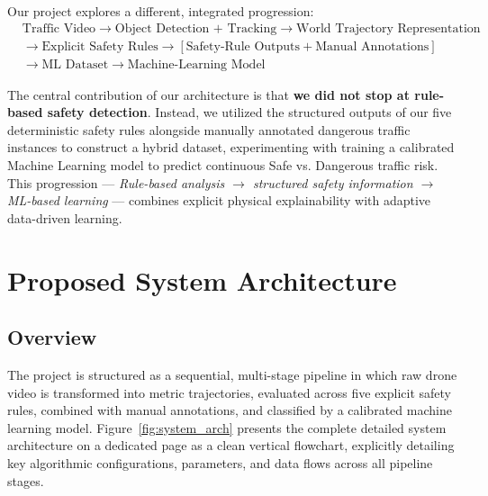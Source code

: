 \documentclass[12pt,a4paper]{report}
\begin{document}
Our project explores a different, integrated progression:
\begin{align*}
&\text{Traffic Video} \rightarrow \text{Object Detection + Tracking} \rightarrow \text{World Trajectory Representation} \\
&\rightarrow \text{Explicit Safety Rules} \rightarrow \left[\text{Safety-Rule Outputs} + \text{Manual Annotations}\right] \\
&\rightarrow \text{ML Dataset} \rightarrow \text{Machine-Learning Model}
\end{align*}

The central contribution of our architecture is that \textbf{we did not stop at rule-based safety detection}. Instead, we utilized the structured outputs of our five deterministic safety rules alongside manually annotated dangerous traffic instances to construct a hybrid dataset, experimenting with training a calibrated Machine Learning model to predict continuous Safe vs. Dangerous traffic risk. This progression --- \emph{Rule-based analysis $\rightarrow$ structured safety information $\rightarrow$ ML-based learning} --- combines explicit physical explainability with adaptive data-driven learning.
\clearpage\thispagestyle{empty}\newpage

\chapter{Proposed System Architecture}
\label{chap:proposed}

\section{Overview}

The project is structured as a sequential, multi-stage pipeline in which raw drone video is transformed into metric trajectories, evaluated across five explicit safety rules, combined with manual annotations, and classified by a calibrated machine learning model. Figure~\ref{fig:system_arch} presents the complete detailed system architecture on a dedicated page as a clean vertical flowchart, explicitly detailing key algorithmic configurations, parameters, and data flows across all pipeline stages.
\end{document}
